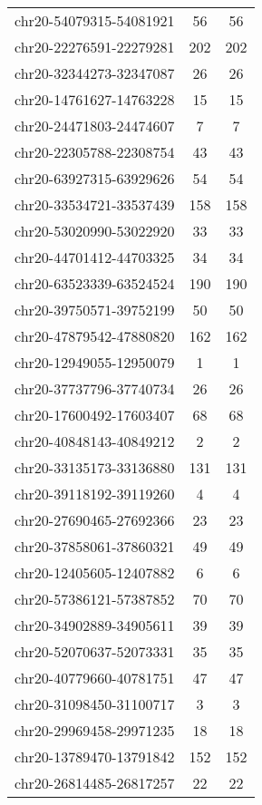 \documentclass[10pt,letterpaper]{article}
\begin{document}
{\begin{longtable}{lSS}
	chr20-54079315-54081921 & 56     & 56       \\
	chr20-22276591-22279281 & 202    & 202      \\
	chr20-32344273-32347087 & 26     & 26       \\
	chr20-14761627-14763228 & 15     & 15       \\
	chr20-24471803-24474607 & 7      & 7        \\
	chr20-22305788-22308754 & 43     & 43       \\
	chr20-63927315-63929626 & 54     & 54       \\
	chr20-33534721-33537439 & 158    & 158      \\
	chr20-53020990-53022920 & 33     & 33       \\
	chr20-44701412-44703325 & 34     & 34       \\
	chr20-63523339-63524524 & 190    & 190      \\
	chr20-39750571-39752199 & 50     & 50       \\
	chr20-47879542-47880820 & 162    & 162      \\
	chr20-12949055-12950079 & 1      & 1        \\
	chr20-37737796-37740734 & 26     & 26       \\
	chr20-17600492-17603407 & 68     & 68       \\
	chr20-40848143-40849212 & 2      & 2        \\
	chr20-33135173-33136880 & 131    & 131      \\
	chr20-39118192-39119260 & 4      & 4        \\
	chr20-27690465-27692366 & 23     & 23       \\
	chr20-37858061-37860321 & 49     & 49       \\
	chr20-12405605-12407882 & 6      & 6        \\
	chr20-57386121-57387852 & 70     & 70       \\
	chr20-34902889-34905611 & 39     & 39       \\
	chr20-52070637-52073331 & 35     & 35       \\
	chr20-40779660-40781751 & 47     & 47       \\
	chr20-31098450-31100717 & 3      & 3        \\
	chr20-29969458-29971235 & 18     & 18       \\
	chr20-13789470-13791842 & 152    & 152      \\
	chr20-26814485-26817257 & 22     & 22       \\

\end{longtable}}
\end{document}
